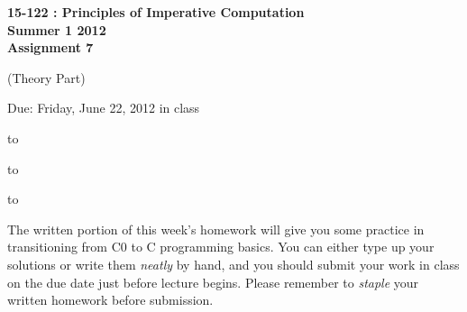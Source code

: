 \documentclass[12pt]{exam}
\begin{document}
\addpoints
\begin{center}
\textbf{\large{15-122 : Principles of Imperative Computation
\\ \vspace{0.2in} Summer 1 2012
\\  \vspace{0.2in} Assignment 7
}}

 \vspace{0.2in}
 (\large{Theory Part})

 \vspace{0.2in}

 \large{Due: Friday, June 22, 2012 in class}
\end{center}

\vspace{0.5in}

\hbox to \textwidth{Name:\enspace\hrulefill}


\vspace{0.2in}

\hbox to \textwidth{Andrew ID:\enspace\hrulefill}

\vspace{0.2in}

\hbox to \textwidth{Recitation:\enspace\hrulefill}


\vspace{0.5in}

\noindent The written portion of this week's homework will give you some practice in transitioning from C0 to C programming basics.
You can either type up your solutions or write them
\textit{neatly} by hand, and you should submit your work in class on the
due date just before lecture begins. Please remember to \textit{staple}
your written homework before submission.
\vspace{0.2in}


\begin{center}
\gradetable[v][questions]
\end{center}
\end{document}
